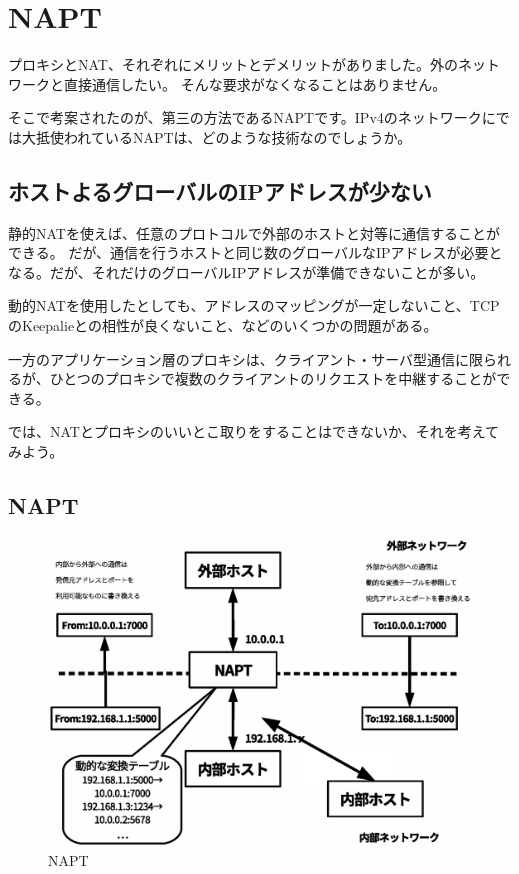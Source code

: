 \chapter{NAPT}

プロキシとNAT、それぞれにメリットとデメリットがありました。外のネットワークと直接通信したい。
そんな要求がなくなることはありません。

そこで考案されたのが、第三の方法であるNAPTです。IPv4のネットワークにでは大抵使われているNAPTは、どのような技術なのでしょうか。

\section{ホストよるグローバルのIPアドレスが少ない}
静的NATを使えば、任意のプロトコルで外部のホストと対等に通信することができる。
だが、通信を行うホストと同じ数のグローバルなIPアドレスが必要となる。だが、それだけのグローバルIPアドレスが準備できないことが多い。

動的NATを使用したとしても、アドレスのマッピングが一定しないこと、TCPのKeepalieとの相性が良くないこと、などのいくつかの問題がある。

一方のアプリケーション層のプロキシは、クライアント・サーバ型通信に限られるが、ひとつのプロキシで複数のクライアントのリクエストを中継することができる。

では、NATとプロキシのいいとこ取りをすることはできないか、それを考えてみよう。


\section{NAPT}

\begin{figure}[htbp]
	\includegraphics[width=12cm,clip]{draw/fig9.eps}
	\caption{NAPT}
	\label{fig:NAPT}
\end{figure}


